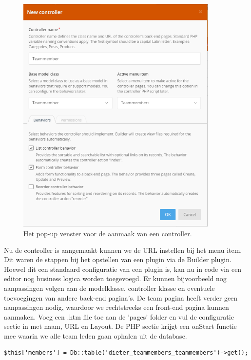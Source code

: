 \begin{figure}[!ht]
  \includegraphics[width=100mm]{img/oc-plugin-teammember-controller.png}
  \centering
  \caption{Het pop-up venster voor de aanmaak van een controller.}
  \label{fig:Teammember controller pop-up.}
\end{figure}

\pagebreak

\noindent
Nu de controller is aangemaakt kunnen we de URL instellen bij het menu item. 
Dit waren de stappen bij het opstellen van een plugin via de Builder plugin. Hoewel dit een standaard configuratie van een plugin is, kan nu in code via een editor nog business logica worden toegevoegd. Er kunnen bijvoorbeeld nog aanpassingen volgen aan de modelklasse, controller klasse en eventuele toevoegingen van andere back-end pagina's.
\newline\newline
De team pagina heeft verder geen aanpassingen nodig, waardoor we rechtstreeks een front-end pagina kunnen aanmaken. Voeg een .htm file toe aan de 'pages' folder en vul de configuratie sectie in met naam, URL en Layout. De PHP sectie krijgt een onStart functie mee waarin we alle team leden gaan ophalen uit de database. 

\begin{verbatim}
$this['members'] = Db::table('dieter_teammembers_teammembers')->get();
\end{verbatim}

